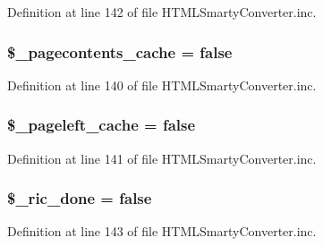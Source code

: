 \-Definition at line 142 of file \-H\-T\-M\-L\-Smarty\-Converter.\-inc.

\hypertarget{class_h_t_m_l_smarty_converter_ac40f5f47daf9683d54026121e0297190}{
\subsubsection[{\$\-\_\-pagecontents\-\_\-cache}]{\setlength{\rightskip}{0pt plus 5cm}\$\-\_\-pagecontents\-\_\-cache = false}}\label{class_h_t_m_l_smarty_converter_ac40f5f47daf9683d54026121e0297190}


\-Definition at line 140 of file \-H\-T\-M\-L\-Smarty\-Converter.\-inc.

\hypertarget{class_h_t_m_l_smarty_converter_a1b9a069d44e6bae7399cf73b9669b56a}{
\subsubsection[{\$\-\_\-pageleft\-\_\-cache}]{\setlength{\rightskip}{0pt plus 5cm}\$\-\_\-pageleft\-\_\-cache = false}}\label{class_h_t_m_l_smarty_converter_a1b9a069d44e6bae7399cf73b9669b56a}


\-Definition at line 141 of file \-H\-T\-M\-L\-Smarty\-Converter.\-inc.

\hypertarget{class_h_t_m_l_smarty_converter_aa0bd6b0e2b9d61819859ef13d3805f8b}{
\subsubsection[{\$\-\_\-ric\-\_\-done}]{\setlength{\rightskip}{0pt plus 5cm}\$\-\_\-ric\-\_\-done = false}}\label{class_h_t_m_l_smarty_converter_aa0bd6b0e2b9d61819859ef13d3805f8b}


\-Definition at line 143 of file \-H\-T\-M\-L\-Smarty\-Converter.\-inc.

